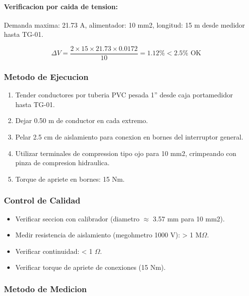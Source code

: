 \paragraph{Verificacion por caida de tension:}
Demanda maxima: 21.73 A, alimentador: 10 mm2, longitud: 15 m desde medidor hasta TG-01.

\begin{equation}
\Delta V = \frac{2 \times 15 \times 21.73 \times 0.0172}{10} = 1.12\% < 2.5\% \text{ OK}
\end{equation}

\subsubsection{Metodo de Ejecucion}

\begin{enumerate}
  \item Tender conductores por tuberia PVC pesada 1'' desde caja portamedidor hasta TG-01.
  \item Dejar 0.50 m de conductor en cada extremo.
  \item Pelar 2.5 cm de aislamiento para conexion en bornes del interruptor general.
  \item Utilizar terminales de compression tipo ojo para 10 mm2, crimpeando con pinza de compresion hidraulica.
  \item Torque de apriete en bornes: 15 Nm.
\end{enumerate}

\subsubsection{Control de Calidad}

\begin{itemize}
  \item Verificar seccion con calibrador (diametro $\approx$ 3.57 mm para 10 mm2).
  \item Medir resistencia de aislamiento (megohmetro 1000 V): > 1 M$\Omega$.
  \item Verificar continuidad: < 1 $\Omega$.
  \item Verificar torque de apriete de conexiones (15 Nm).
\end{itemize}

\subsubsection{Metodo de Medicion}

